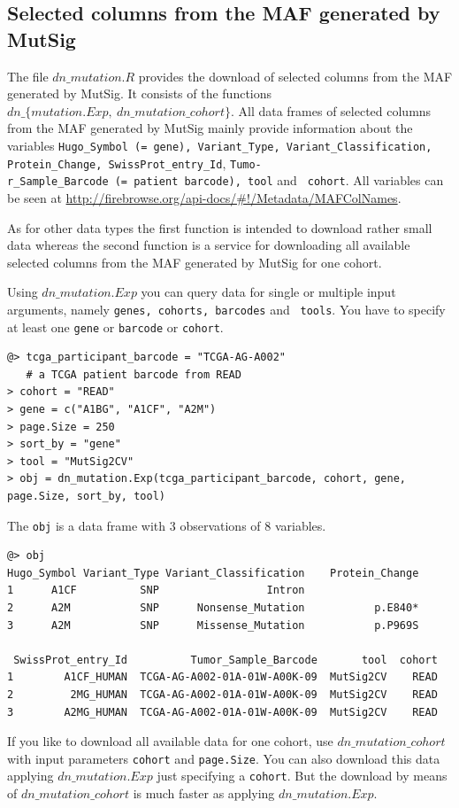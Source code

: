 \documentclass{TechReport}
\begin{document}
 
 


\subsection{Selected columns from the MAF generated by MutSig}
The file $dn\_mutation.R$ provides the download of selected
columns from the MAF generated by MutSig. It consists of the
functions $dn\_\{mutation.Exp,\ dn\_mutation\_cohort\}$. All data
frames of selected columns from the MAF generated by MutSig mainly
provide information about the variables {\tt Hugo\_Symbol
  (= gene), Variant\_Type, Variant\_Classification, Protein\_Change, SwissProt\_entry\_Id},
{\tt Tumo-\\ r\_Sample\_Barcode (= patient barcode), tool} and {\tt
  cohort}. All variables can be seen at
\url{http://firebrowse.org/api-docs/#!/Metadata/MAFColNames}.

As for other data types the first function is intended to download
rather small data whereas the second function is a service for
downloading all available selected
columns from the MAF generated by MutSig for one cohort.

Using $dn\_mutation.Exp$ you can query data for single or multiple
input arguments, namely {\tt genes, cohorts, barcodes} and {\tt
  tools}. You have to specify at least one {\tt gene} or {\tt barcode}
or {\tt cohort}.

\begin{lstlisting}[style=base]
@> tcga_participant_barcode = "TCGA-AG-A002"
   # a TCGA patient barcode from READ
> cohort = "READ"
> gene = c("A1BG", "A1CF", "A2M")
> page.Size = 250
> sort_by = "gene"
> tool = "MutSig2CV"
> obj = dn_mutation.Exp(tcga_participant_barcode, cohort, gene, 
page.Size, sort_by, tool)
\end{lstlisting}
The {\tt obj} is a data frame with 3 observations of 8 variables.
\begin{lstlisting}[style=base]
@> obj
Hugo_Symbol Variant_Type Variant_Classification    Protein_Change 
1      A1CF          SNP                 Intron                        
2      A2M           SNP      Nonsense_Mutation           p.E840*         
3      A2M           SNP      Missense_Mutation           p.P969S   

 SwissProt_entry_Id          Tumor_Sample_Barcode       tool  cohort 
1        A1CF_HUMAN  TCGA-AG-A002-01A-01W-A00K-09  MutSig2CV    READ
2         2MG_HUMAN  TCGA-AG-A002-01A-01W-A00K-09  MutSig2CV    READ
3        A2MG_HUMAN  TCGA-AG-A002-01A-01W-A00K-09  MutSig2CV    READ     
\end{lstlisting}
 If you like to download all available data for one cohort, use  
$dn\_mutation\_cohort$ with input parameters {\tt cohort} and {\tt page.Size}. 
You can also download this data applying $dn\_mutation.Exp$ just specifying 
a {\tt cohort}. But the download by means of $dn\_mutation\_cohort$ 
is much faster as applying $dn\_mutation.Exp$. 
\end{document}
